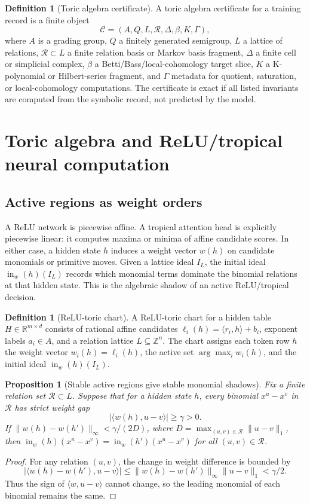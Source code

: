 \documentclass[11pt]{article}
\newtheorem{proposition}[theorem]{Proposition}
\theoremstyle{definition}
\newtheorem{definition}[theorem]{Definition}
\newcommand{\ZZ}{\mathbb{Z}}
\newcommand{\RR}{\mathbb{R}}
\newcommand{\inw}{\operatorname{in}_{w}}
\begin{document}
\begin{definition}[Toric algebra certificate]
A toric algebra certificate for a training record is a finite object
\[
\mathcal{C}=(A,Q,L,\mathcal{R},\Delta,\beta,K,\Gamma),
\]
where \(A\) is a grading group, \(Q\) a finitely generated semigroup, \(L\) a lattice of relations, \(\mathcal{R}\subset L\) a finite relation basis or Markov basis fragment, \(\Delta\) a finite cell or simplicial complex, \(\beta\) a Betti/Bass/local-cohomology target slice, \(K\) a K-polynomial or Hilbert-series fragment, and \(\Gamma\) metadata for quotient, saturation, or local-cohomology computations.  The certificate is exact if all listed invariants are computed from the symbolic record, not predicted by the model.
\end{definition}

\section{Toric algebra and ReLU/tropical neural computation}
\subsection{Active regions as weight orders}
A ReLU network is piecewise affine.  A tropical attention head is explicitly piecewise linear: it computes maxima or minima of affine candidate scores.  In either case, a hidden state \(h\) induces a weight vector \(w(h)\) on candidate monomials or primitive moves.  Given a lattice ideal \(I_L\), the initial ideal \(\inw(h)(I_L)\) records which monomial terms dominate the binomial relations at that hidden state.  This is the algebraic shadow of an active ReLU/tropical decision.

\begin{definition}[ReLU-toric chart]
A ReLU-toric chart for a hidden table \(H\in\RR^{m\times d}\) consists of rational affine candidates \(\ell_i(h)=\langle r_i,h\rangle+b_i\), exponent labels \(a_i\in A\), and a relation lattice \(L\subseteq\ZZ^n\).  The chart assigns each token row \(h\) the weight vector \(w_i(h)=\ell_i(h)\), the active set \(\arg\max_i w_i(h)\), and the initial ideal \(\inw(h)(I_L)\).
\end{definition}

\begin{proposition}[Stable active regions give stable monomial shadows]
Fix a finite relation set \(\mathcal{R}\subset L\).  Suppose that for a hidden state \(h\), every binomial \(x^u-x^v\) in \(\mathcal{R}\) has strict weight gap
\[
|\langle w(h),u-v\rangle|\ge \gamma>0.
\]
If \(\|w(h)-w(h')\|_\infty<\gamma/(2D)\), where \(D=\max_{(u,v)\in\mathcal{R}}\|u-v\|_1\), then \(\inw(h)(x^u-x^v)=\inw(h')(x^u-x^v)\) for all \((u,v)\in\mathcal{R}\).
\end{proposition}
\begin{proof}
For any relation \((u,v)\), the change in weight difference is bounded by
\[
|\langle w(h)-w(h'),u-v\rangle|\le \|w(h)-w(h')\|_\infty\|u-v\|_1 < \gamma/2.
\]
Thus the sign of \(\langle w,u-v\rangle\) cannot change, so the leading monomial of each binomial remains the same.
\end{proof}
\end{document}
